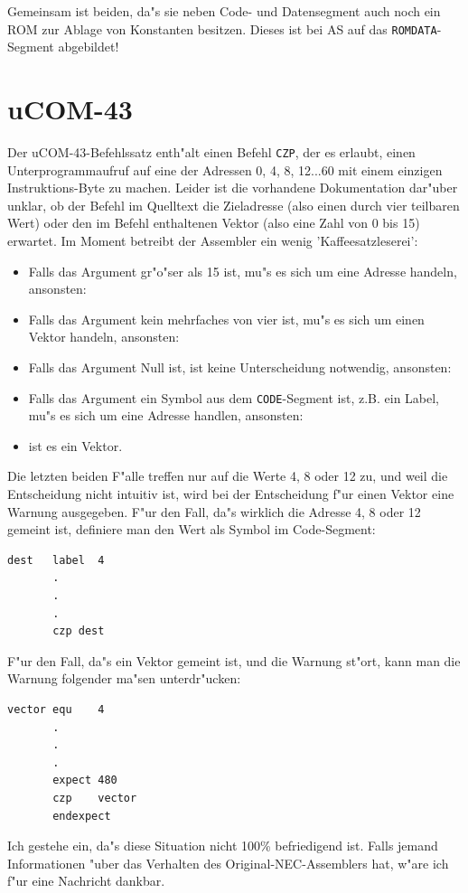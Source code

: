 \documentclass[12pt,a4paper,twoside]{report}
\newcommand{\tty}[1]{{\tt #1}}
\newcommand{\asname}{AS}
\begin{document}
Gemeinsam ist beiden, da"s sie neben Code- und Datensegment auch noch ein
ROM zur Ablage von Konstanten besitzen.  Dieses ist bei \asname{} auf das
\tty{ROMDATA}-Segment abgebildet!


\section{uCOM-43}

Der uCOM-43-Befehlssatz enth"alt einen Befehl {\tt CZP}, der es erlaubt, einen
Unterprogrammaufruf auf eine der Adressen 0, 4, 8, 12...60 mit einem einzigen
Instruktions-Byte zu machen.  Leider ist die vorhandene Dokumentation dar"uber
unklar, ob der Befehl im Quelltext die Zieladresse (also einen durch vier
teilbaren Wert) oder den im Befehl enthaltenen Vektor (also eine Zahl von 0 bis
15) erwartet.  Im Moment betreibt der Assembler ein wenig 'Kaffeesatzleserei':
\begin{itemize}
\item{Falls das Argument gr"o"ser als 15 ist, mu"s es sich um eine Adresse
      handeln, ansonsten:}
\item{Falls das Argument kein mehrfaches von vier ist, mu"s es sich um einen
      Vektor handeln, ansonsten:}
\item{Falls das Argument Null ist, ist keine Unterscheidung notwendig, ansonsten:}
\item{Falls das Argument ein Symbol aus dem {\tt CODE}-Segment ist, z.B. ein Label,
      mu"s es sich um eine Adresse handlen, ansonsten:}
\item{ist es ein Vektor.}
\end{itemize}
Die letzten beiden F"alle treffen nur auf die Werte 4, 8 oder 12 zu, und weil die
Entscheidung nicht intuitiv ist, wird bei der Entscheidung f"ur einen Vektor
eine Warnung ausgegeben.  F"ur den Fall, da"s wirklich die Adresse 4, 8 oder 12
gemeint ist, definiere man den Wert als Symbol im Code-Segment:
\begin{verbatim}
dest   label  4
       .
       .
       .
       czp dest
\end{verbatim}
F"ur den Fall, da"s ein Vektor gemeint ist, und die Warnung st"ort, kann man die
Warnung folgender ma"sen unterdr"ucken:
\begin{verbatim}
vector equ    4
       .
       .
       .
       expect 480
       czp    vector
       endexpect
\end{verbatim}
Ich gestehe ein, da"s diese Situation nicht 100\% befriedigend ist.  Falls
jemand Informationen "uber das Verhalten des Original-NEC-Assemblers hat,
w"are ich f"ur eine Nachricht dankbar.
\end{document}
